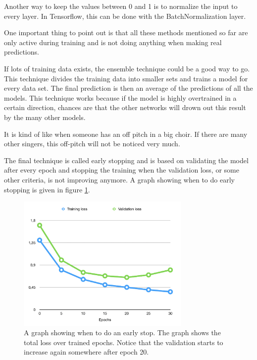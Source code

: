 Another way to keep the values between 0 and 1 is to normalize the input to every layer. In Tensorflow, this can be done with the BatchNormalization layer. \cite{batchnormalization}

One important thing to point out is that all these methods mentioned so far are only active during training and is not doing anything when making real predictions.

If lots of training data exists, the ensemble technique could be a good way to go. This technique divides the training data into smaller sets and trains a model for every data set.
The final prediction is then an average of the predictions of all the models. This technique works because if the model is highly overtrained in a certain direction, chances are that the other networks will drown out this result by the many other models.

It is kind of like when someone has an off pitch in a big choir. If there are many other singers, this off-pitch will not be noticed very much.

The final technique is called early stopping and is based on validating the model after every 
epoch and stopping the training when the validation loss, or some other criteria, is not 
improving anymore. A graph showing when to do early stopping is given in figure \ref{fig:earlystopping}.

\begin{figure}[hbtp]
\begin{center}
\includegraphics[width = 0.75\textwidth]{./Images/early_stop.jpg} 
\caption{A graph showing when to do an early stop. The graph shows the total loss over trained epochs. Notice that the validation starts to increase again somewhere after epoch 20.}
\label{fig:earlystopping}
\end{center}
\end{figure}

